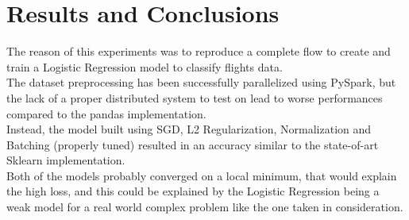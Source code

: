 \documentclass[
	letterpaper, %
	10pt, %
]{class}
\begin{document}

\section{Results and Conclusions}

The reason of this experiments was to reproduce a complete flow to create and train a Logistic Regression model to classify flights data.\\
The dataset preprocessing has been successfully parallelized using PySpark, but the lack of a proper distributed system to test on lead to worse performances compared to the pandas implementation.\\
Instead, the model built using SGD, L2 Regularization, Normalization and Batching (properly tuned) resulted in an accuracy similar to the state-of-art Sklearn implementation.\\
Both of the models probably converged on a local minimum, that would explain the high loss, and this could be explained by the Logistic Regression being a weak model for a real world complex problem like the one taken in consideration.


\printbibliography %


\end{document}
